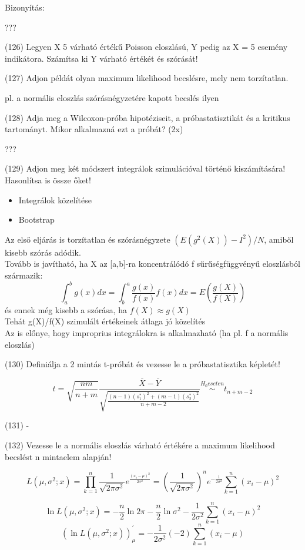 \documentclass[12p]{article}
\begin{document}
Bizonyítás:

???

(126) Legyen X 5 várható értékű Poisson eloszlású, Y pedig az X = 5 esemény indikátora. Számítsa ki Y várható értékét és szórását!

(127) Adjon példát olyan maximum likelihood becslésre, mely nem torzítatlan.

pl. a normális eloszlás szórásnégyzetére kapott becslés ilyen

(128) Adja meg a Wilcoxon-próba hipotéziseit, a próbastatisztikát és a kritikus tartományt.
Mikor alkalmazná ezt a próbát? (2x)

???

(129) Adjon meg két módszert integrálok szimulációval történő kiszámítására! Hasonlítsa is
össze őket!

\begin{itemize}
\item Integrálok közelítése
\item Bootstrap
\end{itemize}

Az első eljárás is torzítatlan és szórásnégyzete $(E(g^2(X)) - I^2) / N$, amiből kisebb szórás adódik.\\
Tovább is javítható, ha X az [a,b]-ra koncentrálódó f sűrűségfüggvényű eloszlásból származik:
$$\int^b_a g(x)dx = \int^a_b \frac{g(x)}{f(x)} f(x)dx = E (\frac{g(X)}{f(X)})$$
és ennek még kisebb a szórása, ha $f(X) \approx g(X)$\\
Tehát g(X)/f(X) szimulált értékeinek átlaga jó közelítés\\
Az is előnye, hogy improprius integrálokra is alkalmazható (ha pl. f a normális eloszlás)


(130) Definiálja a 2 mintás t-próbát és vezesse le a próbastatisztika képletét!

$$t = \sqrt{\frac{nm}{n+m}}\frac{\overline{X} - \overline{Y}}{\sqrt{\frac{(n-1)(s^*_1)^2 + (m-1)(s^*_2)^2}{n+m-2}}} \stackrel{H_0 eseten}{\sim}
t_{n+m-2}$$

(131) -

(132) Vezesse le a normális eloszlás várható értékére a maximum likelihood becslést n mintaelem alapján!

$$L(\mu, \sigma^2;x) 
= \prod^n_{k=1} \frac{1}{\sqrt{2\pi \sigma^2}} 
e^{\frac{(x_i-\mu)^2}{2\sigma^2}}
=\left(\frac{1}{\sqrt{2\pi \sigma^2}}\right)^n 
e^{-\frac{1}{2 \sigma^2}} \sum^n_{k=1} (x_i - \mu )^2$$

$$\ln L(\mu, \sigma^2;x) = - \frac{n}{2} \ln 2\pi - \frac{n}{2} \ln \sigma^2 - \frac{1}{2\sigma^2} \sum^n_{k=1} (x_i - \mu)^2$$
$$(\ln L(\mu,\sigma^2;x))^{'}_{\mu} = - \frac{1}{2\sigma^2}(-2)\sum^n_{k=1}(x_i - \mu)$$
\end{document}
